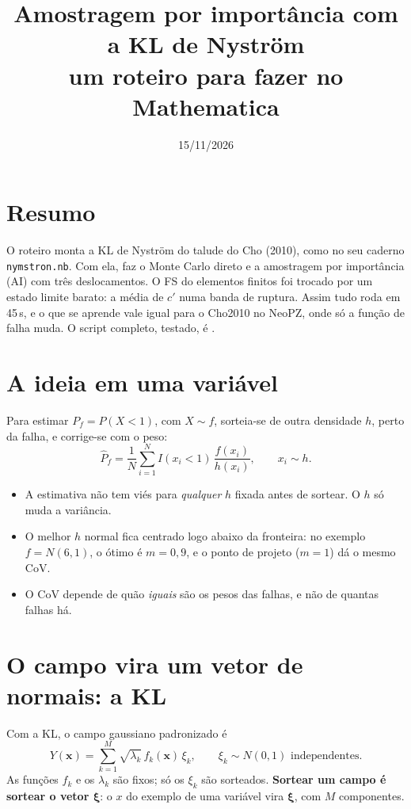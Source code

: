 \documentclass[11pt,a4paper]{article}
\title{Amostragem por importância com a KL de Nyström\\\large um roteiro para fazer no Mathematica}
\date{15/11/2026}
\begin{document}
\maketitle

\section*{Resumo}
O roteiro monta a KL de Nyström do talude do Cho (2010), como no seu caderno \texttt{nymstron.nb}. Com ela, faz o
Monte Carlo direto e a amostragem por importância (AI) com três deslocamentos. O FS do elementos finitos foi trocado
por um estado limite barato: a média de $c'$ numa banda de ruptura. Assim tudo roda em 45\,s, e o que se aprende vale
igual para o Cho2010 no NeoPZ, onde só a função de falha muda. O script completo, testado, é
.

\section{A ideia em uma variável}
Para estimar $P_f = P(X < 1)$, com $X \sim f$, sorteia-se de outra densidade $h$, perto da falha, e corrige-se com o peso:
\[
  \hat P_f = \frac1N \sum_{i=1}^N I(x_i < 1)\,\frac{f(x_i)}{h(x_i)}, \qquad x_i \sim h .
\]
\begin{itemize}
  \item A estimativa não tem viés para \emph{qualquer} $h$ fixada antes de sortear. O $h$ só muda a variância.
  \item O melhor $h$ normal fica centrado logo abaixo da fronteira: no exemplo $f = N(6,1)$, o ótimo é $m = 0{,}9$, e o
    ponto de projeto ($m = 1$) dá o mesmo CoV.
  \item O CoV depende de quão \emph{iguais} são os pesos das falhas, e não de quantas falhas há.
\end{itemize}

\section{O campo vira um vetor de normais: a KL}
Com a KL, o campo gaussiano padronizado é
\[
  Y(\bm x) = \sum_{k=1}^{M} \sqrt{\lambda_k}\, f_k(\bm x)\, \xi_k, \qquad \xi_k \sim N(0,1) \text{ independentes}.
\]
As funções $f_k$ e os $\lambda_k$ são fixos; só os $\xi_k$ são sorteados. \textbf{Sortear um campo é sortear o vetor
$\bm\xi$}: o $x$ do exemplo de uma variável vira $\bm\xi$, com $M$ componentes.
\end{document}
